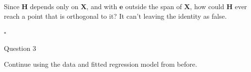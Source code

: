 \documentclass[12pt,letterpaper, onecolumn]{exam}
\begin{document}
\begin{questions}
\begin{solution}
\begin{enumerate}[a.)]
\begin{enumerate}[i.)]
            Since $\textbf{H}$ depends only on $\textbf{X}$, and with $\textbf{e}$ outside the span of $\textbf{X}$, how could $\textbf{H}$ ever reach a point that is orthogonal to it? It can't leaving the identity as false.
            
        \end{enumerate}
            
        \end{enumerate}
    
        $\square$
        
    \end{solution}

    \newpage

    \question[12] Question 3\droppoints

    Continue using the data and fitted regression model from before.


\end{questions}
\end{document}
